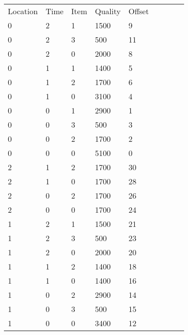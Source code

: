 \documentclass[a4paper,12pt]{article}
\begin{document}
\begin{Large}
\begin{center}
\begin{tabular}{lllllrllr}
 Location & Time & Item & Quality & Offset & \\
   0      &  2   &  1   &  1500   &  9     \\
   0      &  2   &  3   &  500   &  11      \\ 
   0      &  2   &  0   &  2000   &  8     \\
   0      &  1   &  1   &  1400   &  5     \\
   0      &  1   &  2   &  1700   &  6       \\
   0      &  1   &  0   &  3100   &  4     \\
   0      &  0   &  1   &  2900   &  1     \\
   0      &  0   &  3   &  500   &  3     \\
   0      &  0   &  2   &  1700   &  2     \\
   0      &  0   &  0   &  5100   &  0      \\
   2      &  1   &  2   &  1700   &  30    \\
   2      &  1   &  0   &  1700   &  28      \\
   2      &  0   &  2   &  1700   &  26      \\
   2      &  0   &  0   &  1700   &  24    \\
   1      &  2   &  1   &  1500   &  21        \\
   1      &  2   &  3   &  500   &  23      \\
   1      &  2   &  0   &  2000   &  20      \\
   1      &  1   &  2   &  1400   &  18       \\
   1      &  1   &  0   &  1400    &  16     \\
   1      &  0   &  2   &  2900   &  14     \\
   1      &  0   &  3   &  500   &  15    \\
   1      &  0   &  0   &  3400   &  12    \\ 
\end{tabular}
\end{center}
\end{Large}
\end{document}
